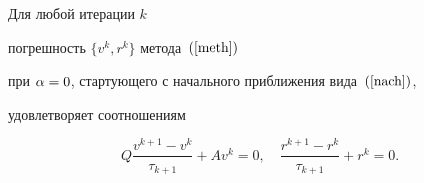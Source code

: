 \begin{lem}


Для любой итерации $k$


погрешность $\{v^k,r^k\}$ метода~$(\ref{meth})$


при $\alpha=0$, стартующего с начального приближения вида~$(\ref{nach})$,


удовлетворяет соотношениям


$$


Q \dfrac {v^{k+1}-v^k} {\tau_{k+1}} + A  v^k =0 , \quad


\dfrac{r^{k+1}-r^k}{\tau_{k+1}} + r^k = 0 .


$$


\end{lem}






